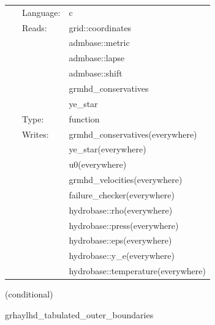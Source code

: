 \documentclass{article}
\begin{document}
\hspace{5mm}{\it tabulated version of grhaylhd\_conservs\_to\_prims } 


\hspace{5mm}

 \begin{tabular*}{160mm}{cll} 
~ & Language:  & c \\ 
~ & Reads:  & grid::coordinates \\ 
~& ~ &admbase::metric\\ 
~& ~ &admbase::lapse\\ 
~& ~ &admbase::shift\\ 
~& ~ &grmhd\_conservatives\\ 
~& ~ &ye\_star\\ 
~ & Type:  & function \\ 
~ & Writes:  & grmhd\_conservatives(everywhere) \\ 
~& ~ &ye\_star(everywhere)\\ 
~& ~ &u0(everywhere)\\ 
~& ~ &grmhd\_velocities(everywhere)\\ 
~& ~ &failure\_checker(everywhere)\\ 
~& ~ &hydrobase::rho(everywhere)\\ 
~& ~ &hydrobase::press(everywhere)\\ 
~& ~ &hydrobase::eps(everywhere)\\ 
~& ~ &hydrobase::y\_e(everywhere)\\ 
~& ~ &hydrobase::temperature(everywhere)\\ 
\end{tabular*} 


\vspace{5mm}

   (conditional) 

\hspace{5mm} grhaylhd\_tabulated\_outer\_boundaries 

\hspace{5mm}{\it tabulated version of grhaylhd\_outer\_boundaries } 


\hspace{5mm}
\end{document}
